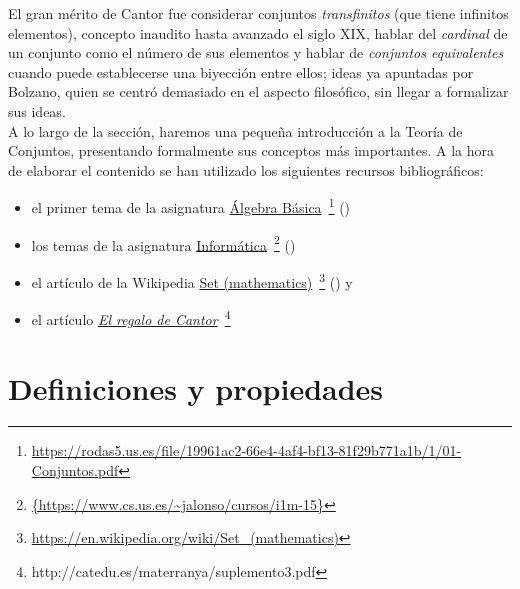El gran mérito de Cantor fue considerar conjuntos \textit{transfinitos} (que
tiene infinitos elementos), concepto inaudito hasta avanzado el siglo XIX,
hablar del \textit{cardinal} de un conjunto como el número de sus elementos y
hablar de \textit{conjuntos equivalentes} cuando puede establecerse una
biyección entre ellos; ideas ya apuntadas por Bolzano, quien se centró
demasiado en el aspecto filosófico, sin llegar a formalizar sus ideas.\\


A lo largo de la sección, haremos una pequeña introducción a la Teoría de
Conjuntos, presentando formalmente sus conceptos más importantes. A la hora de 
elaborar el contenido se han utilizado los siguientes recursos bibliográficos:

\begin{itemize}
\item el primer tema de la asignatura
\href{https://rodas5.us.es/file/19961ac2-66e4-4af4-bf13-81f29b771a1b/1/01-Conjuntos.pdf}
     {Álgebra Básica}\
\footnote{\url{https://rodas5.us.es/file/19961ac2-66e4-4af4-bf13-81f29b771a1b/1/01-Conjuntos.pdf}}
(\cite{Algebra-15a})

\item los temas de la asignatura 
\href{https://www.cs.us.es/~jalonso/cursos/i1m-15}
     {Informática}\
\footnote{\url{{https://www.cs.us.es/~jalonso/cursos/i1m-15}}}
(\cite{Alonso-15a}) 
 
\item el artículo de la Wikipedia
\href{https://en.wikipedia.org/wiki/Set_(mathematics)}
     {Set (mathematics)}\
\footnote{\url{https://en.wikipedia.org/wiki/Set_(mathematics)}}
(\cite{Wikipedia-grafos}) y

\item el artículo
\href{http://catedu.es/materranya/suplemento3.pdf}
     {\textit{El regalo de Cantor}}\
\footnote{http://catedu.es/materranya/suplemento3.pdf}
\end{itemize}

\section{Definiciones y propiedades}


